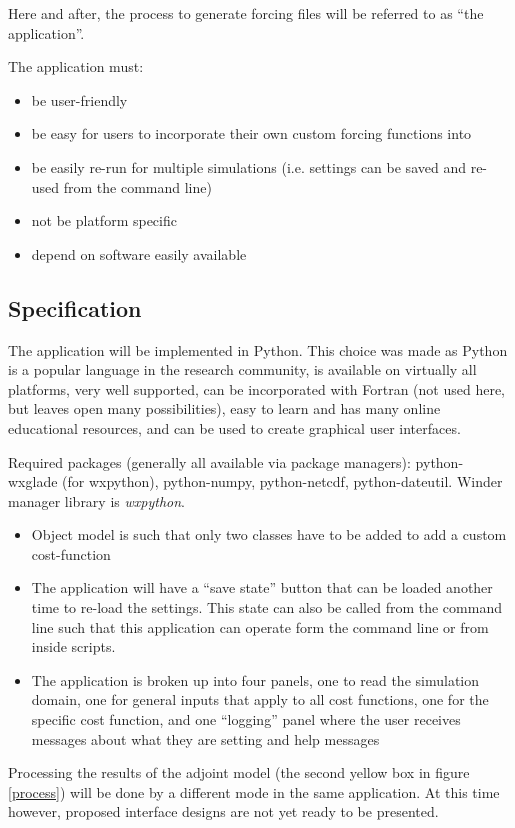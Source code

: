 \documentclass{article}
\begin{document}
Here and after, the process to generate forcing files will be referred to as ``the application''.

The application must:
\begin{itemize}
	\item be user-friendly
	\item be easy for users to incorporate their own custom forcing functions into
	\item be easily re-run for multiple simulations (i.e. settings can be saved and re-used from the command line)
	\item not be platform specific
	\item depend on software easily available
\end{itemize}

\subsection{Specification}

The application will be implemented in Python.  This choice was made as Python is a popular language in the research community, is available on virtually all platforms, very well supported, can be incorporated with Fortran (not used here, but leaves open many possibilities), easy to learn and has many online educational resources, and can be used to create graphical user interfaces.

Required packages (generally all available via package managers): python-wxglade (for wxpython), python-numpy, python-netcdf, python-dateutil.  Winder manager library is \emph{wxpython}.

\begin{itemize}
	\item Object model is such that only two classes have to be added to add a custom cost-function
	\item The application will have a ``save state'' button that can be loaded another time to re-load the settings.  This state can also be called from the command line such that this application can operate form the command line or from inside scripts.
	\item The application is broken up into four panels, one to read the simulation domain, one for general inputs that apply to all cost functions, one for the specific cost function, and one ``logging'' panel where the user receives messages about what they are setting and help messages
\end{itemize}

Processing the results of the adjoint model (the second yellow box in figure \ref{process}) will be done by a different mode in the same application.  At this time however, proposed interface designs are not yet ready to be presented.
\end{document}
